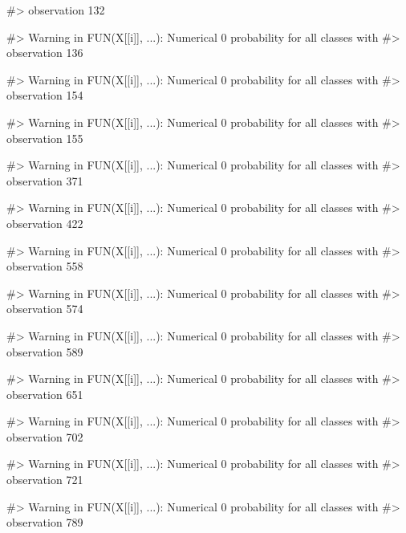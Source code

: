 \begin{Schunk}
\begin{Soutput}
#> observation 132
\end{Soutput}
\begin{Soutput}
#> Warning in FUN(X[[i]], ...): Numerical 0 probability for all classes with
#> observation 136
\end{Soutput}
\begin{Soutput}
#> Warning in FUN(X[[i]], ...): Numerical 0 probability for all classes with
#> observation 154
\end{Soutput}
\begin{Soutput}
#> Warning in FUN(X[[i]], ...): Numerical 0 probability for all classes with
#> observation 155
\end{Soutput}
\begin{Soutput}
#> Warning in FUN(X[[i]], ...): Numerical 0 probability for all classes with
#> observation 371
\end{Soutput}
\begin{Soutput}
#> Warning in FUN(X[[i]], ...): Numerical 0 probability for all classes with
#> observation 422
\end{Soutput}
\begin{Soutput}
#> Warning in FUN(X[[i]], ...): Numerical 0 probability for all classes with
#> observation 558
\end{Soutput}
\begin{Soutput}
#> Warning in FUN(X[[i]], ...): Numerical 0 probability for all classes with
#> observation 574
\end{Soutput}
\begin{Soutput}
#> Warning in FUN(X[[i]], ...): Numerical 0 probability for all classes with
#> observation 589
\end{Soutput}
\begin{Soutput}
#> Warning in FUN(X[[i]], ...): Numerical 0 probability for all classes with
#> observation 651
\end{Soutput}
\begin{Soutput}
#> Warning in FUN(X[[i]], ...): Numerical 0 probability for all classes with
#> observation 702
\end{Soutput}
\begin{Soutput}
#> Warning in FUN(X[[i]], ...): Numerical 0 probability for all classes with
#> observation 721
\end{Soutput}
\begin{Soutput}
#> Warning in FUN(X[[i]], ...): Numerical 0 probability for all classes with
#> observation 789
\end{Soutput}
\begin{Soutput}

\end{Soutput}
\end{Schunk}
